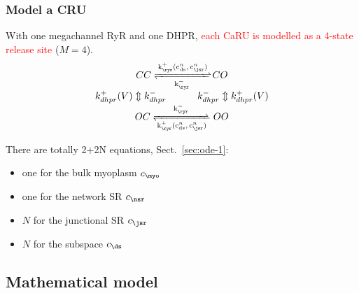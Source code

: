

\subsubsection{Model a CRU}
\label{sec:model-cru}

With one megachannel RyR and one DHPR,
\textcolor{red}{each CaRU is modelled as a 4-state release site} ($M =
4$).
\begin{equation}
  \label{eq:163}
  \begin{array}{c}
    CC \ce{<=>[k^+_\ryr(c^n_{ds},c^n_\jsr)][k^-_\ryr]} CO \\
    k^+_{dhpr}(V) \Updownarrow  k^-_{dhpr}   
    \text{\hspace{10 mm}     } k^-_{dhpr} \Updownarrow  k^+_{dhpr}(V)  \\
    OC \ce{<=>[k^-_\ryr][k^+_\ryr(c^n_{ds},c^n_\jsr)]}OO\\
  \end{array}
\end{equation}

There are totally 2+2N equations, Sect.~\ref{sec:ode-1}: 
\begin{itemize}
\item one for the bulk myoplasm $c_\myo$
\item one for the network SR $c_\nsr$
\item $N$ for the junctional SR $c_\jsr$
\item $N$ for the subspace $c_\ds$
\end{itemize}


\subsection{Mathematical model}
\label{sec:mathematical-model-16}



